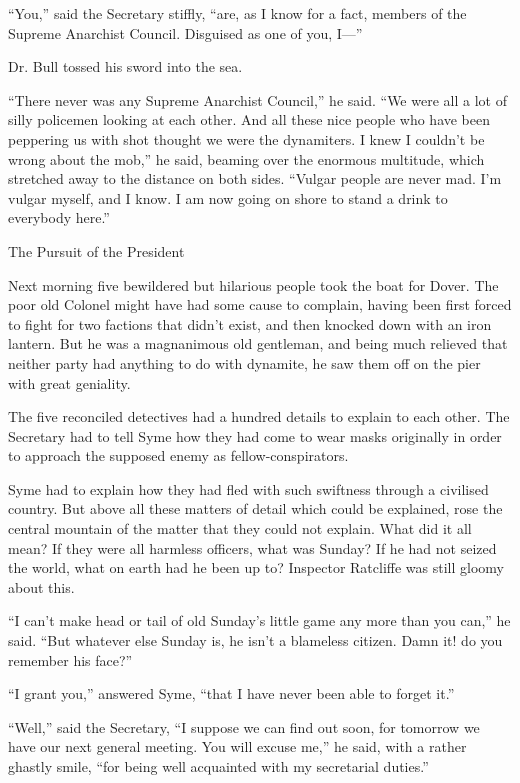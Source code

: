 “You,” said the Secretary stiffly, “are, as I know for a fact, members of the Supreme Anarchist Council. Disguised as one of you, I⁠—”

Dr. Bull tossed his sword into the sea.

“There never was any Supreme Anarchist Council,” he said. “We were all a lot of silly policemen looking at each other. And all these nice people who have been peppering us with shot thought we were the dynamiters. I knew I couldn’t be wrong about the mob,” he said, beaming over the enormous multitude, which stretched away to the distance on both sides. “Vulgar people are never mad. I’m vulgar myself, and I know. I am now going on shore to stand a drink to everybody here.”

\chap The Pursuit of the President

Next morning five bewildered but hilarious people took the boat for Dover. The poor old Colonel might have had some cause to complain, having been first forced to fight for two factions that didn’t exist, and then knocked down with an iron lantern. But he was a magnanimous old gentleman, and being much relieved that neither party had anything to do with dynamite, he saw them off on the pier with great geniality.

The five reconciled detectives had a hundred details to explain to each other. The Secretary had to tell Syme how they had come to wear masks originally in order to approach the supposed enemy as fellow-conspirators.

Syme had to explain how they had fled with such swiftness through a civilised country. But above all these matters of detail which could be explained, rose the central mountain of the matter that they could not explain. What did it all mean? If they were all harmless officers, what was Sunday? If he had not seized the world, what on earth had he been up to? Inspector Ratcliffe was still gloomy about this.

“I can’t make head or tail of old Sunday’s little game any more than you can,” he said. “But whatever else Sunday is, he isn’t a blameless citizen. Damn it! do you remember his face?”

“I grant you,” answered Syme, “that I have never been able to forget it.”

“Well,” said the Secretary, “I suppose we can find out soon, for tomorrow we have our next general meeting. You will excuse me,” he said, with a rather ghastly smile, “for being well acquainted with my secretarial duties.”

